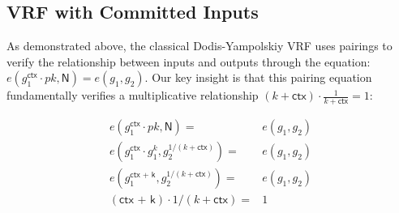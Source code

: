 \subsection{VRF with Committed Inputs}
As demonstrated above, the classical Dodis-Yampolskiy VRF uses pairings to verify the relationship between inputs and outputs through the equation: $e(g_1^{\textsf{ctx}} \cdot pk, \mathsf{N}) = e(g_1, g_2)$. Our key insight is that this pairing equation fundamentally verifies a multiplicative relationship $(k + \textsf{ctx}) \cdot \frac{1}{k + \textsf{ctx}} = 1$:

\begin{align*}
    e(g_1^{\textsf{ctx}} \cdot pk, \mathsf{N}) =& e(g_1, g_2)    \\
    e(g_1^{\textsf{ctx}} \cdot g_1^k, g_2^{1/(k + \textsf{ctx})}) =& e(g_1, g_2) \\
    e(g_1^{\textsf{ctx + k}}, g_2^{1/(k + \textsf{ctx})}) =& e(g_1, g_2) \\
    (\textsf{ctx + k}) \cdot 1/(k + \textsf{ctx})  =& 1 \\
\end{align*}






